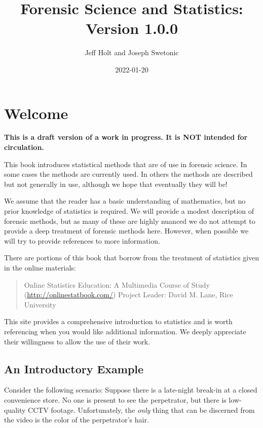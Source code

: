 \documentclass[
]{book}
\title{Forensic Science and Statistics: Version 1.0.0}
\author{Jeff Holt and Joseph Swetonic}
\date{2022-01-20}
\begin{document}
\maketitle

{
\setcounter{tocdepth}{1}
\tableofcontents
}
\hypertarget{welcome}{%
\chapter{Welcome}\label{welcome}}

\textbf{This is a draft version of a work in progress. It is NOT intended for circulation.}

This book introduces statistical methods that are of use in forensic science.
In some cases the methods are currently used.
In others the methods are described but not generally in use,
although we hope that eventually they will be!

We assume that the reader has a basic understanding of mathematics, but no prior
knowledge of statistics is required.
We will provide a modest description of forensic methods, but as many of these are
highly nuanced we do not attempt to
provide a deep treatment of forensic methods here. However, when possible we will
try to provide references to more information.

There are portions of this book that borrow from the treatment of statistics
given in the online materials:

\begin{quote}
Online Statistics Education: A Multimedia Course of Study (\url{http://onlinestatbook.com/})
Project Leader: David M. Lane, Rice University
\end{quote}

This site provides a comprehensive introduction to statistics and is worth referencing when you would like additional information.
We deeply appreciate their willingness to allow the use of their work.

\hypertarget{an-introductory-example}{%
\section{An Introductory Example}\label{an-introductory-example}}

Consider the following scenario:
Suppose there is a late-night break-in at a closed convenience store.
No one is present to see the perpetrator, but there is low-quality CCTV footage.
Unfortunately, the \emph{only} thing that can be discerned from the video is the
color of the perpetrator's hair.
\end{document}
